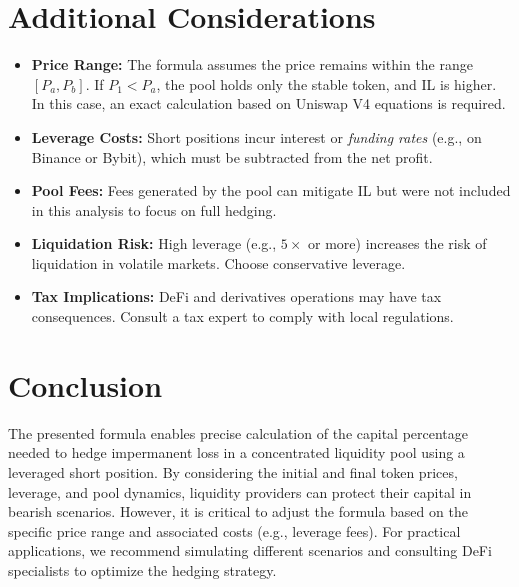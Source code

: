 \documentclass[11pt]{article}
\begin{document}
\section{Additional Considerations}
\begin{itemize}
    \item \textbf{Price Range:} The formula assumes the price remains within the range \([P_a, P_b]\). If \(P_1 < P_a\), the pool holds only the stable token, and IL is higher. In this case, an exact calculation based on Uniswap V4 equations is required.
    \item \textbf{Leverage Costs:} Short positions incur interest or \textit{funding rates} (e.g., on Binance or Bybit), which must be subtracted from the net profit.
    \item \textbf{Pool Fees:} Fees generated by the pool can mitigate IL but were not included in this analysis to focus on full hedging.
    \item \textbf{Liquidation Risk:} High leverage (e.g., \(5\times\) or more) increases the risk of liquidation in volatile markets. Choose conservative leverage.
    \item \textbf{Tax Implications:} DeFi and derivatives operations may have tax consequences. Consult a tax expert to comply with local regulations.
\end{itemize}

\section{Conclusion}
The presented formula enables precise calculation of the capital percentage needed to hedge impermanent loss in a concentrated liquidity pool using a leveraged short position. By considering the initial and final token prices, leverage, and pool dynamics, liquidity providers can protect their capital in bearish scenarios. However, it is critical to adjust the formula based on the specific price range and associated costs (e.g., leverage fees). For practical applications, we recommend simulating different scenarios and consulting DeFi specialists to optimize the hedging strategy.
\end{document}
